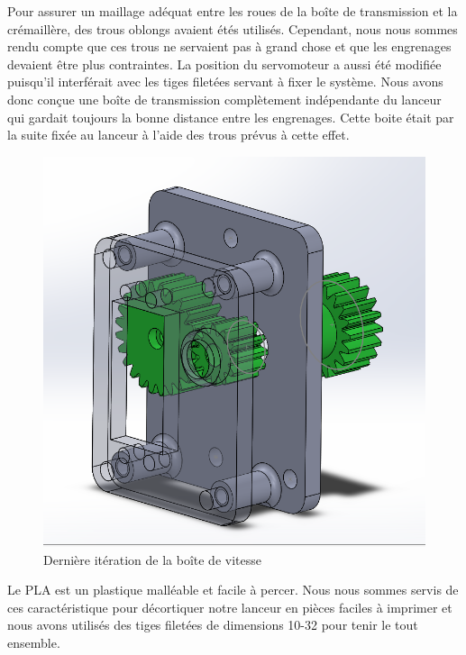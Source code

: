 Pour assurer un maillage adéquat entre les roues de la boîte de transmission et la crémaillère, des trous oblongs avaient étés utilisés.
Cependant, nous nous sommes rendu compte que ces trous ne servaient pas à grand chose et que les engrenages devaient être plus contraintes.
La position du servomoteur a aussi été modifiée puisqu’il interférait avec les tiges filetées servant à fixer le système.
Nous avons donc conçue une boîte de transmission complètement indépendante du lanceur qui gardait toujours la bonne distance entre les engrenages.
Cette boite était par la suite fixée au lanceur à l’aide des trous prévus à cette effet.

\begin{figure}[h!]
    \centering
    \includegraphics[width=0.4\linewidth]{img/s2/cad/gearbox2}
    \caption{Dernière itération de la boîte de vitesse}
    \label{fig:s2-cad-gearbox2}
\end{figure}

Le PLA est un plastique malléable et facile à percer.
Nous nous sommes servis de ces caractéristique pour décortiquer notre lanceur en pièces faciles à imprimer et nous avons utilisés des tiges filetées de dimensions 10-32 pour tenir le tout ensemble.


